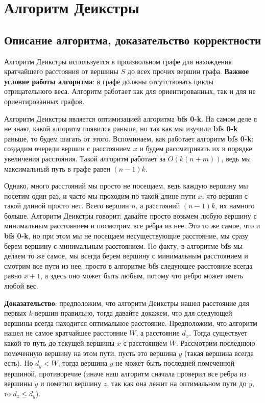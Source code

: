 \documentclass[../../main.tex]{subfiles}
\begin{document}
\section{Алгоритм Деикстры}

\subsection{Описание алгоритма, доказательство корректности}

Алгоритм Деикстры используется в произвольном графе для нахождения кратчайшего расстояния от вершины $S$ до всех прочих вершин графа. 
\textbf{Важное условие работы алгоритма}: в графе должны отсутствовать циклы отрицательного веса. Алгоритм работает как для ориентированных, так и для не ориентированных графов.

Алгоритм Деикстры является оптимизацией алгоритма \textbf{bfs 0-k}. На самом деле я не знаю, какой алгоритм появился раньше, но так как мы изучили 
\textbf{bfs 0-k} раньше, то будем шагать от этого. Вспоминаем, как работает алгоритм \textbf{bfs 0-k}: создадим очереди вершин с расстоянием $x$ и будем
рассматривать их в порядке увеличения расстояния. Такой алгоритм работает за $O(k(n+m))$, ведь мы максимальный путь в графе равен $(n-1)k$. 

Однако, много расстояний мы просто не посещаем, ведь каждую вершину мы посетим один раз, и часто мы проходим по такой длине пути $x$, что вершин с такой длиной просто нет.
Всего вершин $n$, а расстояний $(n-1)k$, их намного больше. Алгоритм Деикстры говорит: давайте просто возьмем любую вершину с минимальным расстоянием и посмотрим все ребра из нее.
Это то же самое, что и \textbf{bfs 0-k}, но при этом мы не посещаем несуществующие расстояние, мы сразу берем вершину с минимальным расстоянием. 
По факту, в алгоритме \textbf{bfs} мы делаем то же самое, мы всегда берем вершину с минимальным расстоянием и смотрим все пути из нее, просто в алгоритме \textbf{bfs} следующее расстояние
всегда равно $x+1$, а здесь оно может быть любым, потому что ребро может иметь любой вес. 

\textbf{Доказательство}: предположим, что алгоритм Деикстры нашел расстояние для первых $k$ вершин правильно, тогда давайте докажем, что
для следующей вершины всегда находится оптимальное расстояние. Предположим, что алгоритм нашел не самое кратчайшее расстояние $W$, а расстояние $d_x$. 
Тогда существует какой-то путь до текущей вершины $x$ с расстоянием $W$. Рассмотрим последнюю помеченную вершину на этом пути, пусть это вершина $y$ (такая вершина всегда есть). 
Но $d_y < W$, тогда вершина $y$ не может быть последней помеченной вершиной, противоречие (иначе наш алгоритм сначала проверил все 
ребра из вершины $y$ и пометил вершину $z$, так как она лежит на оптимальном пути до $y$, то $d_z \leq d_y$). 
\end{document}
